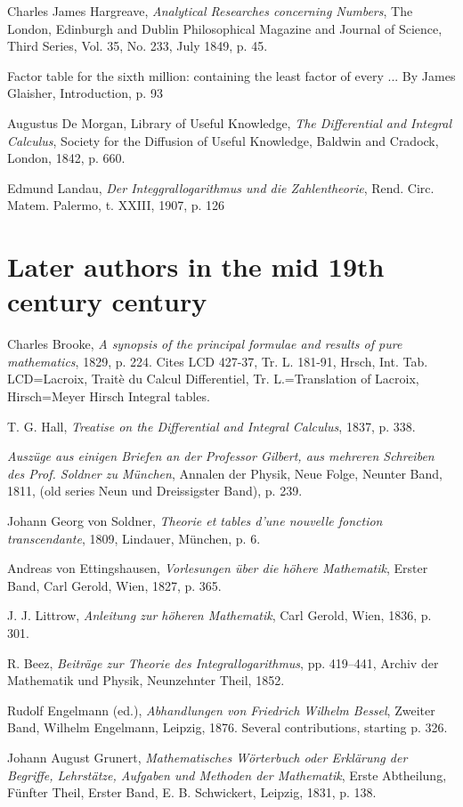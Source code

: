 \documentclass{article}
\begin{document}
Charles James Hargreave,
{\em Analytical Researches concerning Numbers},
The London, Edinburgh and Dublin Philosophical Magazine and Journal of Science,
Third Series, Vol. 35, No. 233, July 1849, 
p. 45.

Factor table for the sixth million: containing the least factor of every ... By James Glaisher, Introduction, p. 93

Augustus De Morgan,
Library of Useful Knowledge,
{\em The Differential and Integral Calculus},
Society for the Diffusion of Useful Knowledge, Baldwin and Cradock,
London, 1842, p. 660.

Edmund Landau,
{\em Der Integgrallogarithmus und die Zahlentheorie},
Rend. Circ. Matem. Palermo, t. XXIII, 1907, p. 126

\section{Later authors in the mid 19th century century}
Charles Brooke,
{\em A synopsis of the principal formulae and results of pure mathematics},
1829,
p. 224. Cites LCD 427-37, Tr. L. 181-91, Hrsch, Int. Tab.
LCD=Lacroix, Traitè du Calcul Differentiel,
Tr. L.=Translation of Lacroix,
Hirsch=Meyer Hirsch Integral tables.

T. G. Hall,
{\em Treatise on the Differential and Integral Calculus},
1837, p. 338.

{\em Ausz\"uge aus einigen Briefen an der Professor Gilbert, aus mehreren Schreiben
des Prof. Soldner zu M\"unchen},
Annalen der Physik, Neue Folge, Neunter Band, 1811, (old series
Neun und Dreissigster Band), 
p. 239.

Johann Georg von Soldner,
{\em Theorie et tables d'une nouvelle fonction transcendante},
1809, Lindauer, M\"unchen, p. 6.

Andreas von Ettingshausen, {\em Vorlesungen \"uber die h\"ohere Mathematik},
Erster Band,
Carl Gerold, Wien, 1827, p. 365.

J. J. Littrow,
{\em Anleitung zur h\"oheren Mathematik},
Carl Gerold, Wien, 1836, p. 301.

R. Beez,
{\em Beitr\"age zur Theorie des Integrallogarithmus},
pp. 419--441, Archiv der Mathematik und Physik, Neunzehnter Theil, 1852.

Rudolf Engelmann (ed.),
{\em Abhandlungen von Friedrich Wilhelm Bessel},
Zweiter Band, Wilhelm Engelmann, Leipzig, 1876.
Several contributions, starting p. 326.

Johann August Grunert, {\em Mathematisches W\"orterbuch oder Erkl\"arung der
Begriffe,
Lehrst\"atze, Aufgaben und Methoden der Mathematik}, Erste Abtheilung,
F\"unfter Theil, Erster Band, E. B. Schwickert, Leipzig, 1831, p. 138.
\end{document}
